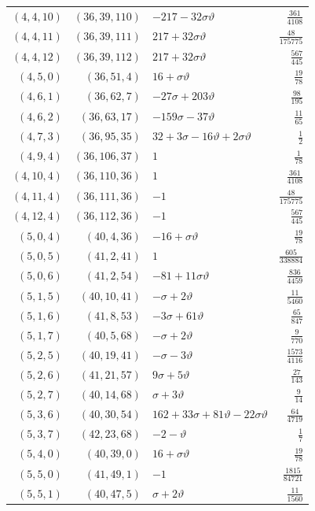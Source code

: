 \begin{longtable}{rrlr}
$(4,4,10)$ & $(36,39,110)$ & $-217-32\sigma\vartheta$ & $\frac{361}{4108}$\\
$(4,4,11)$ & $(36,39,111)$ & $217+32\sigma\vartheta$ & $\frac{48}{175775}$\\
$(4,4,12)$ & $(36,39,112)$ & $217+32\sigma\vartheta$ & $\frac{567}{445}$\\
$(4,5,0)$ & $(36,51,4)$ & $16+\sigma\vartheta$ & $\frac{19}{78}$\\
$(4,6,1)$ & $(36,62,7)$ & $-27\sigma+203\vartheta$ & $\frac{98}{195}$\\
$(4,6,2)$ & $(36,63,17)$ & $-159\sigma-37\vartheta$ & $\frac{11}{65}$\\
$(4,7,3)$ & $(36,95,35)$ & $32+3\sigma-16\vartheta+2\sigma\vartheta$ & $\frac{1}{2}$\\
$(4,9,4)$ & $(36,106,37)$ & $1$ & $\frac{1}{78}$\\
$(4,10,4)$ & $(36,110,36)$ & $1$ & $\frac{361}{4108}$\\
$(4,11,4)$ & $(36,111,36)$ & $-1$ & $\frac{48}{175775}$\\
$(4,12,4)$ & $(36,112,36)$ & $-1$ & $\frac{567}{445}$\\
$(5,0,4)$ & $(40,4,36)$ & $-16+\sigma\vartheta$ & $\frac{19}{78}$\\
$(5,0,5)$ & $(41,2,41)$ & $1$ & $\frac{605}{338884}$\\
$(5,0,6)$ & $(41,2,54)$ & $-81+11\sigma\vartheta$ & $\frac{836}{4459}$\\
$(5,1,5)$ & $(40,10,41)$ & $-\sigma+2\vartheta$ & $\frac{11}{5460}$\\
$(5,1,6)$ & $(41,8,53)$ & $-3\sigma+61\vartheta$ & $\frac{65}{847}$\\
$(5,1,7)$ & $(40,5,68)$ & $-\sigma+2\vartheta$ & $\frac{9}{770}$\\
$(5,2,5)$ & $(40,19,41)$ & $-\sigma-3\vartheta$ & $\frac{1573}{4116}$\\
$(5,2,6)$ & $(41,21,57)$ & $9\sigma+5\vartheta$ & $\frac{27}{143}$\\
$(5,2,7)$ & $(40,14,68)$ & $\sigma+3\vartheta$ & $\frac{9}{14}$\\
$(5,3,6)$ & $(40,30,54)$ & $162+33\sigma+81\vartheta-22\sigma\vartheta$ & $\frac{64}{4719}$\\
$(5,3,7)$ & $(42,23,68)$ & $-2-\vartheta$ & $\frac{1}{7}$\\
$(5,4,0)$ & $(40,39,0)$ & $16+\sigma\vartheta$ & $\frac{19}{78}$\\
$(5,5,0)$ & $(41,49,1)$ & $-1$ & $\frac{1815}{84721}$\\
$(5,5,1)$ & $(40,47,5)$ & $\sigma+2\vartheta$ & $\frac{11}{1560}$\\

\end{longtable}
